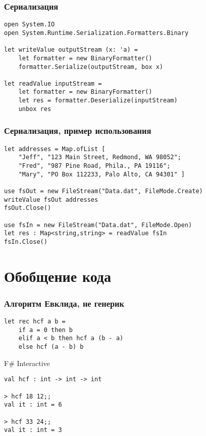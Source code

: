 \documentclass[xetex,mathserif,serif]{beamer}
\begin{document}
    \begin{frame}[fragile]
        \frametitle{Сериализация}
        \begin{verbatim}
open System.IO
open System.Runtime.Serialization.Formatters.Binary

let writeValue outputStream (x: 'a) =
    let formatter = new BinaryFormatter()
    formatter.Serialize(outputStream, box x)

let readValue inputStream =
    let formatter = new BinaryFormatter()
    let res = formatter.Deserialize(inputStream)
    unbox res
        \end{verbatim}
    \end{frame}

    \begin{frame}[fragile]
        \frametitle{Сериализация, пример использования}
        \begin{verbatim}
let addresses = Map.ofList [ 
    "Jeff", "123 Main Street, Redmond, WA 98052";
    "Fred", "987 Pine Road, Phila., PA 19116";
    "Mary", "PO Box 112233, Palo Alto, CA 94301" ]

use fsOut = new FileStream("Data.dat", FileMode.Create)
writeValue fsOut addresses
fsOut.Close()

use fsIn = new FileStream("Data.dat", FileMode.Open)
let res : Map<string,string> = readValue fsIn
fsIn.Close()
        \end{verbatim}
    \end{frame}

    \section{Обобщение кода}

    \begin{frame}[fragile]
        \frametitle{Алгоритм Евклида, не генерик}
        \begin{verbatim}
let rec hcf a b =
    if a = 0 then b
    elif a < b then hcf a (b - a)
    else hcf (a - b) b
        \end{verbatim}

        \begin{alertblock}{F\# Interactive}
            \begin{verbatim}
val hcf : int -> int -> int

> hcf 18 12;;
val it : int = 6

> hcf 33 24;;
val it : int = 3
            \end{verbatim}
        \end{alertblock}
    \end{frame}
\end{document}
